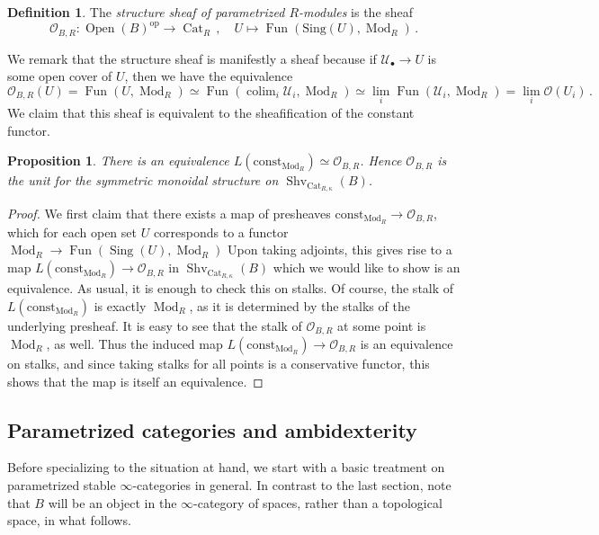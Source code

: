 \documentclass[10pt]{amsart}
\newcommand{\longto}{\longrightarrow}
\theoremstyle{plain}
\newtheorem{proposition}[theorem]{Proposition}
\theoremstyle{definition}
\newtheorem{definition}[theorem]{Definition}
\DeclareMathOperator*{\colim}{colim}
\DeclareMathOperator{\Mod}{Mod}
\DeclareMathOperator{\Shv}{Shv}
\DeclareMathOperator{\Sing}{Sing}
\DeclareMathOperator{\Fun}{Fun}
\DeclareMathOperator{\Open}{Open}
\DeclareMathOperator{\Cat}{Cat}
\newcommand{\oop}{\mathrm{op}}
\newcommand{\cO}{\mathcal{O}}
\begin{document}
\begin{definition}
  The \emph{structure sheaf of parametrized $R$-modules} is the sheaf
  \[
  \cO_{B,R} : \Open(B)^{\oop} \longto \Cat_{R} \,, \quad U \mapsto \Fun(\mathrm{Sing}(U),\Mod_R) \,.
  \]
\end{definition}

We remark that the structure sheaf is manifestly a sheaf because if $ \mathcal{U}_\bullet \to U$ is some open cover of $U$, then we have the equivalence
\[
\cO_{B,R}(U) = \Fun(U , \Mod_R)  \simeq \Fun (\colim_i \mathcal{U}_i, \Mod_R) \simeq \lim_i \Fun( \mathcal{U}_i, \Mod_R)  = \lim_i \cO(U_i) \,.
\]
We claim that this sheaf is equivalent to the sheafification of the constant functor.

\begin{proposition}
There is an equivalence $L(\mathrm{const}_{\Mod_R}) \simeq  \cO_{B,R}$. Hence $\cO_{B,R}$ is the unit for the symmetric monoidal structure on $\Shv_{\mathrm{Cat}_{R, \kappa}}(B)$.
\end{proposition}


\begin{proof}
We first claim that there exists a map of presheaves $\mathrm{const}_{\Mod_R} \to  \cO_{B,R}$, which for each open set $U$ corresponds to a functor $\Mod_R \to \Fun(\Sing(U), \Mod_R)$
Upon taking adjoints, this gives rise to a map $L(\mathrm{const}_{\Mod_R}) \to  \cO_{B,R}$
in $\Shv_{\Cat_{R,\kappa}}(B)$ which we would like to show is an equivalence.
As usual, it is enough to check this on stalks.
Of course, the stalk of $L(\mathrm{const}_{\Mod_R}) $ is exactly $\Mod_R$, as it is determined by the stalks of the  underlying presheaf.
It is easy to see that the stalk of $\cO_{B,R}$ at some point is $\Mod_R$, as well.
Thus the induced map $L(\mathrm{const}_{\Mod_R}) \to  \cO_{B,R}$ is an equivalence on stalks, and since taking stalks for all points is a conservative functor, this shows that the map is itself an equivalence.
\end{proof}

\subsection{Parametrized categories and ambidexterity}
\label{sec:parametrized_cats}

Before specializing to the situation at hand, we start with a basic treatment on parametrized stable $\infty$-categories in general.
In contrast to the last section, note that $B$ will be an object in the $\infty$-category of spaces, rather than a topological space, in what follows.
\end{document}
